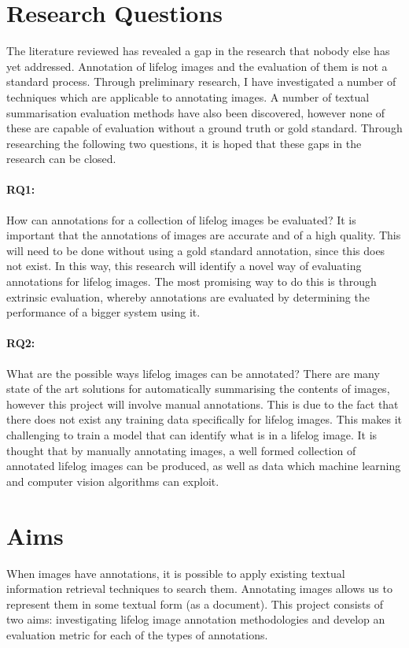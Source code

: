 \documentclass[12pt,a4paper]{article}
\begin{document}

\section{Research Questions}
The literature reviewed has revealed a gap in the research that nobody else has yet addressed. Annotation of lifelog images and the evaluation of them is not a standard process. Through preliminary research, I have investigated a number of techniques which are applicable to annotating images. A number of textual summarisation evaluation methods have also been discovered, however none of these are capable of evaluation without a ground truth or gold standard. Through researching the following two questions, it is hoped that these gaps in the research can be closed.

\paragraph{RQ1:} How can annotations for a collection of lifelog images be evaluated?
It is important that the annotations of images are accurate and of a high quality. This will need to be done without using a gold standard annotation, since this does not exist. In this way, this research will identify a novel way of evaluating annotations for lifelog images. The most promising way to do this is through extrinsic evaluation, whereby annotations are evaluated by determining the performance of a bigger system using it.

\paragraph{RQ2:} What are the possible ways lifelog images can be annotated?
There are many state of the art solutions for automatically summarising the contents of images, however this project will involve manual annotations. This is due to the fact that there does not exist any training data specifically for lifelog images. This makes it challenging to train a model that can identify what is in a lifelog image. It is thought that by manually annotating images, a well formed collection of annotated lifelog images can be produced, as well as data which machine learning and computer vision algorithms can exploit.

\section{Aims}
When images have annotations, it is possible to apply existing textual information retrieval techniques to search them. Annotating images allows us to represent them in some textual form (as a document). This project consists of two aims: investigating lifelog image annotation methodologies and develop an evaluation metric for each of the types of annotations.
\end{document}
